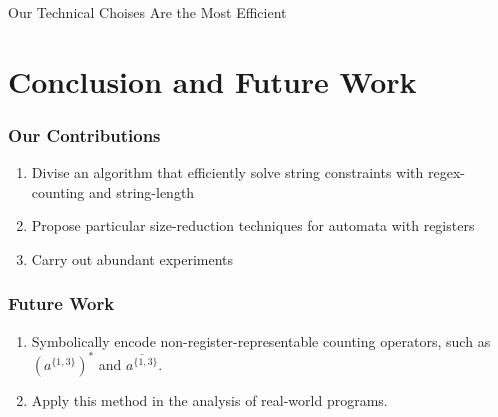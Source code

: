 \documentclass[landscape]{beamer}
\begin{document}
\begin{frame}{Our Technical Choises Are the Most Efficient}
  \centering
  
\end{frame}

\section{Conclusion and Future Work}
\begin{frame}
  \frametitle{Our Contributions}
  \begin{enumerate}
    \item Divise an algorithm that efficiently solve string constraints with regex-counting and string-length
    \item Propose particular size-reduction techniques for automata with registers
    \item Carry out abundant experiments
  \end{enumerate}
\end{frame}


\begin{frame}
  \frametitle{Future Work}
  \begin{enumerate}
    \item Symbolically encode non-register-representable counting operators, such as $(a^{\{1,3\}})^*$ and $\overline{a^{\{1,3\}}}$.
    \item Apply this method in the analysis of real-world programs.
  \end{enumerate}
\end{frame}
\end{document}
